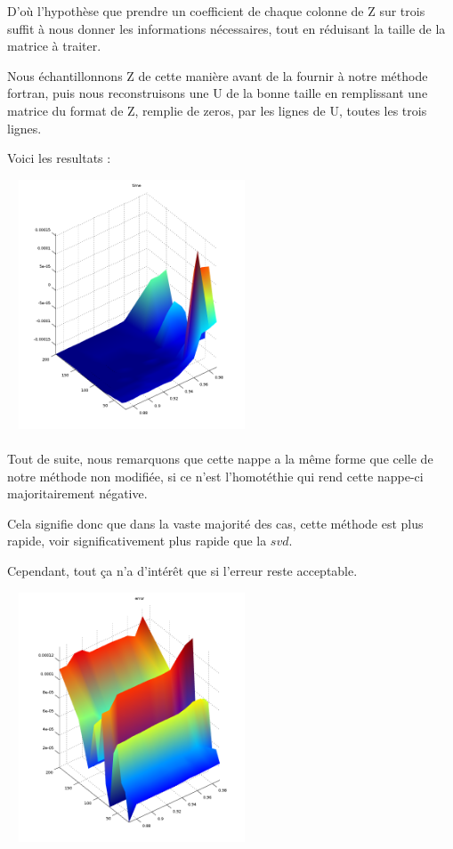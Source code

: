 \documentclass[a4paper,12pt]{article}
\begin{document}
    D'où l'hypothèse que prendre un coefficient de chaque colonne de Z sur trois suffit
    à nous donner les informations nécessaires, tout en réduisant la taille de la
    matrice à traiter.

    Nous échantillonnons Z de cette manière avant de la fournir à notre méthode
    fortran, puis nous reconstruisons une U de la bonne taille en remplissant une
    matrice du format de Z, remplie de zeros, par les lignes de U, toutes les trois
    lignes.

    Voici les resultats :

    \bigskip
    \begin{center}
    \includegraphics[width=20em, height=20em]{time2_1.png}
    \end{center}

    \paragraph{}
    Tout de suite, nous remarquons que cette nappe a la même forme que celle de
    notre méthode non modifiée, si ce n'est l'homotéthie qui rend cette nappe-ci
    majoritairement négative.

    Cela signifie donc que dans la vaste majorité des cas, cette méthode est plus
    rapide, voir significativement plus rapide que la $svd$.

    Cependant, tout ça n'a d'intérêt que si l'erreur reste acceptable.

    \bigskip
    \begin{center}
    \includegraphics[width=20em, height=20em]{error2_1.png}
    \end{center}
\end{document}
